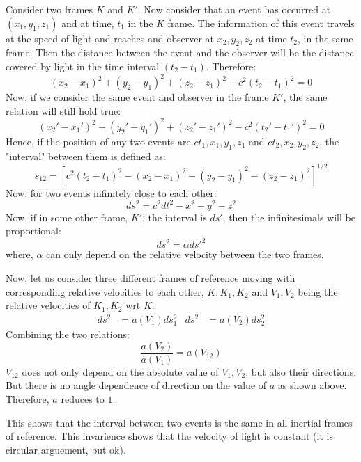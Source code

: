 \documentclass[12pt, oneside]{book}
\begin{document}
Consider two frames \(K\) and \(K'\).
Now consider that an event has occurred at \((x_1,y_1,z_1)\) and at time, \(t_1\) in the \(K\) frame.
The information of this event travels at the speed of light and reaches and observer at \(x_2,y_2,z_2\) at time \(t_2\), in the same frame.
Then the distance between the event and the observer will be the distance covered by light in the time interval \((t_2 - t_1)\). Therefore:
\[\left(x_2 - x_1\right)^2 + \left(y_2 - y_1\right)^2 + \left(z_2 - z_1\right)^2 - c^2\left(t_2 - t_1\right)^2 = 0 \]
Now, if we consider the same event and observer in the frame \(K'\), the same relation will still hold true:
\[\left(x_2' - x_1'\right)^2 + \left(y_2' - y_1'\right)^2 + \left(z_2' - z_1'\right)^2 - c^2\left(t_2' - t_1'\right)^2 = 0 \]
Hence, if the position of any two events are \(ct_1, x_1, y_1, z_1\) and \(ct_2, x_2, y_2, z_2\), the "interval" between them is defined as:
\[s_{12} = \left[ c^2(t_2 - t_1)^2 - (x_2 - x_1)^2 - (y_2 - y_1)^2 - (z_2 - z_1)^2 \right]^{1/2}\]
Now, for two events infinitely close to each other:
\[ds^2 = c^2 dt^2 - x^2 - y^2 - z^2\]
Now, if in some other frame, \(K'\), the interval is \(ds'\), then the infinitesimals will be proportional:
\[ds^2 = \alpha ds'^2\]
where, \(\alpha\) can only depend on the relative velocity between the two frames.

Now, let us consider three different frames of reference moving with corresponding relative velocities to each other, \(K, K_1, K_2\) and \(V_1, V_2\) being the relative velocities of \(K_1, K_2\) wrt \(K\).
\begin{align*}
ds^2 &= a(V_1)ds_1^2 &
ds^2 &= a(V_2)ds_2^2 
\end{align*} 
Combining the two relations:
\[\frac{a(V_2)}{a(V_1)} = a(V_{12})\]
\(V_{12}\) does not only depend on the absolute value of \(V_1, V_2\), but also their directions.
But there is no angle dependence of direction on the value of \(a\) as shown above.
Therefore, \(a\) reduces to \(1\).

This shows that the interval between two events is the same in all inertial frames of reference.
This invarience shows that the velocity of light is constant (it is circular arguement, but ok). 
\end{document}
